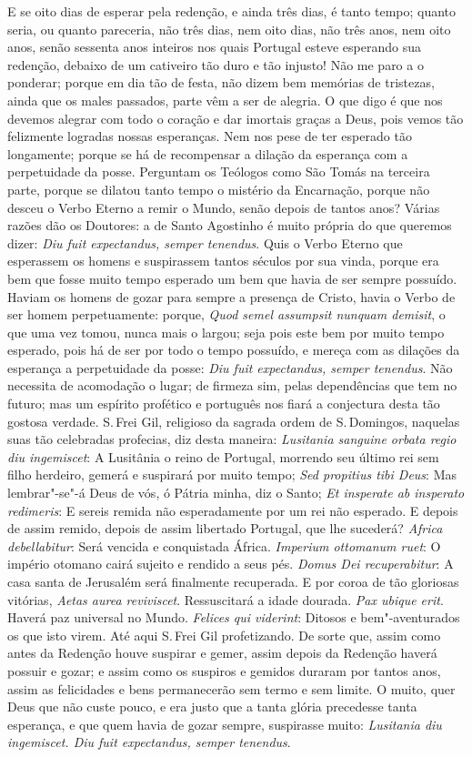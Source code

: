 E se oito dias de esperar pela redenção, e ainda três dias, é tanto
tempo; quanto seria, ou quanto pareceria, não três dias, nem oito dias,
não três anos, nem oito anos, senão sessenta anos inteiros nos quais
Portugal esteve esperando sua redenção, debaixo de um cativeiro tão duro
e tão injusto! Não me paro a o ponderar; porque em dia tão de festa, não
dizem bem memórias de tristezas, ainda que os males passados, parte vêm
a ser de alegria. O que digo é que nos devemos alegrar com todo o
coração e dar imortais graças a Deus, pois vemos tão felizmente logradas
nossas esperanças. Nem nos pese de ter esperado tão longamente; porque
se há de recompensar a dilação da esperança com a perpetuidade da posse.
Perguntam os Teólogos como São Tomás na terceira parte, porque se
dilatou tanto tempo o mistério da Encarnação, porque não desceu o Verbo
Eterno a remir o Mundo, senão depois de tantos anos? Várias razões dão
os Doutores: a de Santo Agostinho é muito própria do que queremos dizer:
\emph{Diu fuit expectandus, semper tenendus}. Quis o Verbo Eterno que
esperassem os homens e suspirassem tantos séculos por sua vinda, porque
era bem que fosse muito tempo esperado um bem que havia de ser sempre
possuído. Haviam os homens de gozar para sempre a presença de Cristo,
havia o Verbo de ser homem perpetuamente: porque, \emph{Quod semel
assumpsit nunquam demisit}, o que uma vez tomou, nunca mais o largou;
seja pois este bem por muito tempo esperado, pois há de ser por todo o
tempo possuído, e mereça com as dilações da esperança a perpetuidade da
posse: \emph{Diu fuit expectandus, semper tenendus}.
Não necessita de acomodação o lugar; de firmeza sim, pelas dependências
que tem no futuro; mas um espírito profético e português nos fiará a
conjectura desta tão gostosa verdade. S.\,Frei Gil, religioso da sagrada
ordem de S.\,Domingos, naquelas suas tão celebradas profecias, diz desta
maneira: \emph{Lusitania sanguine orbata regio diu ingemiscet}: A
Lusitânia o reino de Portugal, morrendo seu último rei sem filho
herdeiro, gemerá e suspirará por muito tempo; \emph{Sed propitius tibi
Deus}: Mas lembrar"-se"-á Deus de vós, ó Pátria minha, diz o Santo; \emph{Et
insperate ab insperato redimeris}: E sereis remida não esperadamente
por um rei não esperado. E depois de assim remido, depois de assim
libertado Portugal, que lhe sucederá? \emph{Africa debellabitur}:
Será vencida e conquistada África. \emph{Imperium ottomanum ruet}: O
império otomano cairá sujeito e rendido a seus pés. \emph{Domus Dei
recuperabitur}: A casa santa de Jerusalém será finalmente recuperada. E
por coroa de tão gloriosas vitórias, \emph{Aetas aurea reviviscet}.
Ressuscitará a idade dourada. \emph{Pax ubique erit}.
Haverá paz universal no Mundo. \emph{Felices qui viderint}: Ditosos e
bem"-aventurados os que isto virem.
Até aqui S.\,Frei Gil profetizando. De sorte que, assim como antes da
Redenção houve suspirar e gemer, assim depois da Redenção haverá possuir
e gozar; e assim como os suspiros e gemidos duraram por tantos anos,
assim as
felicidades e bens permanecerão sem termo e sem limite. O muito, quer
Deus que não custe pouco, e era justo que a tanta glória precedesse
tanta esperança, e que quem havia de gozar sempre, suspirasse muito:
\emph{Lusitania diu ingemiscet. Diu fuit expectandus, semper tenendus}.

